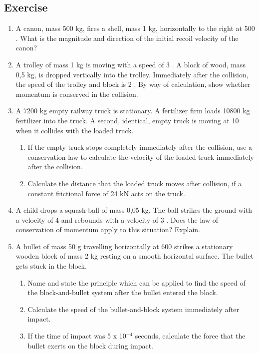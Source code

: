 \subsection{Exercise}
\begin{enumerate}
\item{A canon, mass 500 kg, fires a shell, mass 1 kg, horizontally to the right at 500 \ms. What is the magnitude and direction of the initial recoil velocity of the canon?}
\item{A trolley of mass 1 kg is moving with a speed of 3 \ms. A block of wood, mass 0,5 kg, is dropped vertically into the trolley. Immediately after the collision, the speed of the trolley and block is 2 \ms. By way of calculation, show whether momentum is conserved in the collision.}
\item{A 7200 kg empty railway truck is stationary. A fertilizer firm loads 10800 kg fertilizer into the truck. A second, identical, empty truck is moving at 10 \ms when it collides with the loaded truck.
\begin{enumerate}
\item If the empty truck stops completely immediately after the collision, use a conservation law to calculate the velocity of the loaded truck immediately after the collision.
\item Calculate the distance that the loaded truck moves after collision, if a constant frictional force of 24 kN acts on the truck.
\end{enumerate}}
\item{A child drops a squash ball of mass 0,05 kg. The ball strikes the ground with a velocity of 4 \ms and rebounds with a velocity of 3 \ms. Does the law of conservation of momentum apply to this situation? Explain.}
\item{A bullet of mass 50 g travelling horizontally at 600 \ms strikes a stationary wooden block of mass 2 kg resting on a smooth horizontal surface. The bullet gets stuck in the block.
\begin{enumerate}
\item Name and state the principle which can be applied to find the speed of the block-and-bullet system after the bullet entered the block.
\item Calculate the speed of the bullet-and-block system immediately after impact.
\item If the time of impact was 5 x 10$^{-4}$ seconds, calculate the force that the bullet exerts on the block during impact.
\end{enumerate}}
\end{enumerate}


